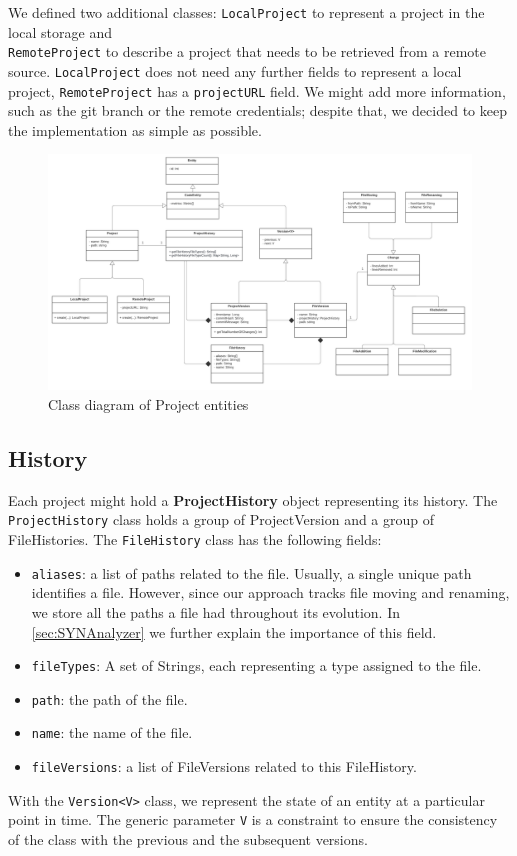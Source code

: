 We defined two additional classes: \texttt{LocalProject} to represent a project in the local storage and \\ \texttt{RemoteProject} to describe a project that needs to be retrieved from a remote source. 
\texttt{LocalProject} does not need any further fields to represent a local project, \texttt{RemoteProject} has a \texttt{projectURL} field. We might add more information, such as the git branch or the remote credentials; despite that, we decided to keep the implementation as simple as possible. 


\begin{figure}
    \center
    \includegraphics[width=\textwidth]{SYNClass.png}
    \caption{Class diagram of Project entities}
    \label{fig:SYNCLass}
\end{figure}

\subsection{History}

Each project might hold a \textbf{ProjectHistory} object representing its history. 
The \texttt{ProjectHistory} class holds a group of ProjectVersion and a group of FileHistories. The \texttt{FileHistory} class has the following fields:
\begin{itemize}
    \item \texttt{aliases}: a list of paths related to the file. Usually, a single unique path identifies a file. However, since our approach tracks file moving and renaming, we store all the paths a file had throughout its evolution. In \autoref{sec:SYNAnalyzer} we further explain the importance of this field. 
    \item \texttt{fileTypes}: A set of Strings, each representing a type assigned to the file. 
    \item \texttt{path}: the path of the file. 
    \item \texttt{name}: the name of the file.
    \item \texttt{fileVersions}: a list of FileVersions related to this FileHistory. 
\end{itemize}
With the \texttt{Version<V>} class, we represent the state of an entity at a particular point in time. 
The generic parameter \texttt{V} is a constraint to ensure the consistency of the class with the previous and the subsequent versions. 

